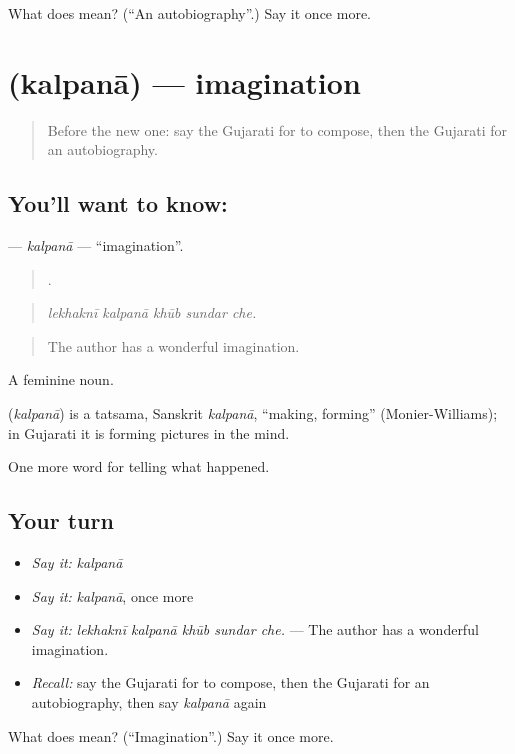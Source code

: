 \begin{tcolorbox}[breakable,colback=teal!4,colframe=teal!35!black,title={Before you move on}]
What does  mean? (\textquotedblleft{}An autobiography\textquotedblright{}.) Say it once more.
\end{tcolorbox}
\section[\texorpdfstring{\gu{કલ્પના} (kalpanā)}{કલ્પના (kalpanā)}]{ (kalpanā) — imagination}

\label{lesson:GU-C336-kalpana}



\begin{quote}
Before the new one: say the Gujarati for to compose, then the Gujarati for an autobiography.
\end{quote}

\subsection*{You'll want to know: }
\textbf{} — \emph{kalpanā} — \textquotedblleft{}imagination\textquotedblright{}.

\begin{quote}
    .
\end{quote}

\begin{quote}
\emph{lekhaknī kalpanā khūb sundar che.}
\end{quote}

\begin{quote}
The author has a wonderful imagination.
\end{quote}

A feminine noun.

\begin{cousinweb}
\textbf{} (\emph{kalpanā}) is a tatsama, Sanskrit \emph{kalpanā}, \textquotedblleft{}making, forming\textquotedblright{} (Monier-Williams); in Gujarati it is forming pictures in the mind.
\end{cousinweb}

\begin{grammarlens}[title={What you've built}]
One more word for telling what happened.
\end{grammarlens}

\subsection*{Your turn}
\begin{itemize}
\raggedright
  \item \emph{Say it:} \emph{kalpanā}
  \item \emph{Say it:} \emph{kalpanā}, once more
  \item \emph{Say it:} \emph{lekhaknī kalpanā khūb sundar che.} — The author has a wonderful imagination.
  \item \emph{Recall:} say the Gujarati for to compose, then the Gujarati for an autobiography, then say \emph{kalpanā} again
\end{itemize}

\begin{tcolorbox}[breakable,colback=teal!4,colframe=teal!35!black,title={Before you move on}]
What does  mean? (\textquotedblleft{}Imagination\textquotedblright{}.) Say it once more.
\end{tcolorbox}
